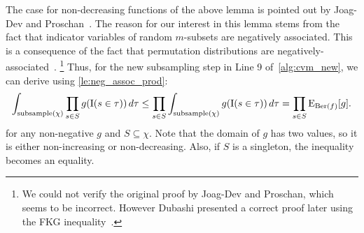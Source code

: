 The case for non-decreasing functions of the above lemma is pointed out by Joag-Dev and Proschan~\cite[P.2]{joagdev1983}.
The reason for our interest in this lemma stems from the fact that indicator variables of random $m$-subsets are negatively associated.
This is a consequence of the fact that permutation distributions are negatively-associated~\cite[Th. 2.11]{joagdev1983}.%
\footnote{We could not verify the original proof by Joag-Dev and Proschan, which seems to be incorrect.
However Dubashi presented a correct proof later using the FKG inequality~\cite[Th. 10]{dubhashi1996}.}
Thus, for the new subsampling step in Line 9 of~\cref{alg:cvm_new}, we can derive using \cref{le:neg_assoc_prod}:
\begin{equation}\label{eq:subsample_with_n_subsets}
  \int_{\mathrm{subsample}(\chi)} \prod_{s \in S} g(\operatorname{\mathrm{I}}(s \in \tau))\,d\tau \leq
  \prod_{s \in S} \int_{\mathrm{subsample}(\chi)} g(\operatorname{\mathrm{I}}(s \in \tau))\,d\tau = \prod_{s \in S}  \operatorname{\mathrm{E}}_{\operatorname{\mathrm{Ber}}(f)}[g] \textrm{.}
\end{equation}
for any non-negative $g$ and $S \subseteq \chi$.
Note that the domain of $g$ has two values, so it is either non-increasing or non-decreasing.
Also, if $S$ is a singleton, the inequality becomes an equality.


